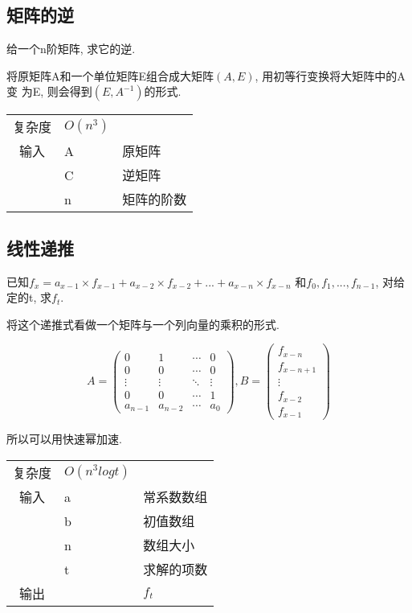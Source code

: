     \subsection{矩阵的逆}\small
给一个n阶矩阵, 求它的逆.

将原矩阵A和一个单位矩阵E组合成大矩阵$(A, E)$, 用初等行变换将大矩阵中的A变
为E, 则会得到$(E, A^{-1})$的形式.
\begin{longtable}{|c|l|l|}
复杂度 & $O(n^3)$ & \\
输入 & A & 原矩阵 \\
 & C & 逆矩阵 \\
 & n & 矩阵的阶数 \\
\end{longtable}



    \subsection{线性递推}\small
已知$f_x = a_{x-1} \times f_{x-1} + a_{x-2} \times f_{x-2} + ... + a_{x-n} \times f_{x-n}$
和$f_0, f_1, ..., f_{n-1}$, 对给定的t, 求$f_t$.

将这个递推式看做一个矩阵与一个列向量的乘积的形式.

\[A = \left( {\begin{array}{*{20}{c}}
0&1& \cdots &0\\
0&0& \cdots &0\\
 \vdots & \vdots & \ddots & \vdots \\
0&0& \cdots &1\\
{{a_{n - 1}}}&{{a_{n - 2}}}& \cdots &{{a_0}}
\end{array}} \right),B = \left( {\begin{array}{*{20}{c}}
{{f_{x - n}}}\\
{{f_{x - n + 1}}}\\
 \vdots \\
{{f_{x - 2}}}\\
{{f_{x - 1}}}
\end{array}} \right)\]

所以可以用快速幂加速.
\begin{longtable}{|c|l|l|}
复杂度 & $O(n^{3}logt)$ & \\
输入 & a & 常系数数组 \\
 & b & 初值数组 \\
 & n & 数组大小 \\
 & t & 求解的项数 \\
输出 &  & $f_t$ \\
\end{longtable}



